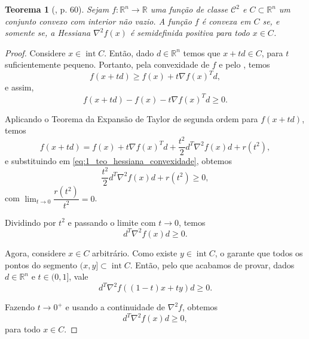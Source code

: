 \documentclass[12pt,a4paper]{scrartcl}
\DeclareMathOperator{\interior}{int}
\def\RR{\mathds{R}}
\newtheorem{teo}{Teorema}
\theoremstyle{definition}%
\begin{document}
\begin{teo} [\textcite{Ademir2013}, p. 60] \label{teo:hessiana_convexidade}
Sejam $f:\RR^{n} \rightarrow \RR $ uma função de classe $\mathcal{C}^{2}$ e $C \subset \RR^{n}$ um conjunto convexo com interior não vazio. A função $f$ é convexa em $C$ se, e somente se, a Hessiana $\nabla^{2} f(x)$ é semidefinida positiva para todo $x \in C$.
\end{teo}
\begin{proof}
Considere $x \in \interior C$. Então, dado $d \in \RR^{n}$ temos que $x+td \in C$, para $t$ suficientemente pequeno. Portanto, pela convexidade de $f$ e pelo , temos
\[
f(x+td) \geq f(x) + t\nabla f(x)^{T} d ,
\]
e assim, 
\[ \label{eq:1_teo_hessiana_convexidade}
f(x+td) -f(x) - t\nabla f(x)^{T} d \geq 0 . 
\]

Aplicando o Teorema da Expansão de Taylor de segunda ordem para $f(x+td)$, temos
\[
f(x+td) = f(x) + t\nabla f(x)^{T}d + \dfrac{t^{2}}{2}d^{T} \nabla^{2} f(x)d + r(t^{2}) ,
\]
e substituindo em \eqref{eq:1_teo_hessiana_convexidade}, obtemos
\[
\dfrac{t^{2}}{2}d^{T} \nabla^{2} f(x)d + r(t^{2}) \geq 0 ,
\]
com $\lim_{t \rightarrow 0} \dfrac{r(t^{2})}{t^{2}} = 0$. 

Dividindo por $t^{2}$ e passando o limite com $t \rightarrow 0$, temos
\[
d^{T} \nabla^{2} f(x)d \geq 0 .
\]

Agora, considere $x \in C$ arbitrário. Como existe $y \in \interior C$, o  garante que todos os pontos do segmento $(x,y] \subset \interior C$. Então, pelo que acabamos de provar, dados $d \in \RR^{n}$ e $t\in (0,1]$, vale
\[
d^{T} \nabla^{2} f((1-t)x+ty)d \geq 0 .
\]

Fazendo $t \rightarrow 0^{+}$ e usando a continuidade de $\nabla^{2} f$, obtemos
\[
d^{T} \nabla^{2} f(x)d \geq 0,
\]
para todo $x \in C$.


\end{proof}

\newpage

\printbibliography
\end{document}
